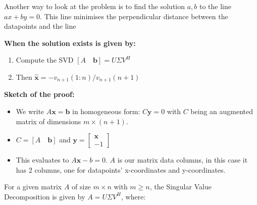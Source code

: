Another way to look at the problem is to find the solution $a,b$ to the line $ax + by = 0$. This line minimises the perpendicular distance between the datapoints and the line\\


\begin{figure}[H]
    \centering
{}
\end{figure}



\textbf{When the solution exists is given by:}
\begin{enumerate}
    \item Compute the SVD \([A \quad \mathbf{b}] = U\Sigma V^H\)
    \item Then \(\mathbf{\hat{x}} = -v_{n+1}(1:n)/v_{n+1}(n + 1)\)
\end{enumerate}

\textbf{Sketch of the proof:}
\begin{itemize}
    \item We write \(A\mathbf{x} = \mathbf{b}\) in homogeneous form: \(C\mathbf{y}=0\) with $C$ being an augmented matrix of dimensions $m \times (n+1)$.
    \item \(C = [A \quad \mathbf{b}] \) and \(\mathbf{y} = \begin{bmatrix}\mathbf{x} \\ -1\end{bmatrix}\)
    \item This evaluates to $A\textbf{x} - b = 0$. $A$ is our matrix data columns, in this case it has 2 columns, one for datapoints' x-coordinates and y-coordinates.
\end{itemize}
For a given matrix \( A \) of size \( m \times n \) with \( m \geq n \), the Singular Value Decomposition is given by \( A = U\Sigma V^H \), where:

